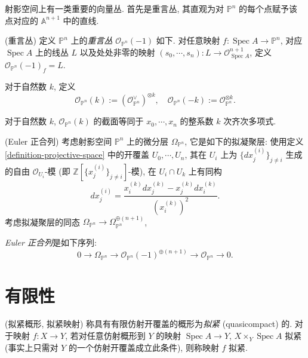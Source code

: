 \documentclass{book}
\begin{document}
	射影空间上有一类重要的向量丛.
	首先是重言丛, 其直观为对 $\mathbb P^n$ 的每个点赋予该点对应的 $\mathbb A^{n+1}$ 中的直线.
	
	\begin{definition}
		{(重言丛)}
		定义 $\mathbb P^n$ 上的\emph{重言丛} $\mathcal O_{\mathbb P^n}(-1)$ 如下.
		对任意映射 $f\colon \operatorname{Spec} A\to \mathbb P^n$, 对应 $\operatorname{Spec} A$ 上的线丛 $L$ 以及处处非零的映射 $(s_0,\cdots,s_n)\colon L\to \mathcal O_{\operatorname{Spec} A}^{n+1}$,
		定义 $\mathcal O_{\mathbb P^n}(-1)_f = L.$
	\end{definition}
	
	\begin{definition}
		{}
		对于自然数 $k$, 定义
		$$
		\mathcal O_{\mathbb P^n}(k):= (\mathcal O_{\mathbb P^n}^\vee)^{\otimes k},\quad
		\mathcal O_{\mathbb P^n}(-k):=\mathcal O_{\mathbb P^n}^{\otimes k}.
		$$
	\end{definition}
	
	\begin{prop}
		{}
		对于自然数 $k$,
		$\mathcal O_{\mathbb P^n}(k)$
		的截面等同于 $x_0,\cdots,x_n$ 的整系数 $k$ 次齐次多项式.
	\end{prop}
	
	\begin{prop}
		{(Euler 正合列)}
		考虑射影空间 $\mathbb P^n$ 上的微分层 $\Omega_{\mathbb P^n}$, 它是如下的拟凝聚层: 使用定义 \ref{definition-projective-space} 中的开覆盖 $U_0,\cdots,U_n$, 其在 $U_i$ 上为 $\{dx_j^{(i)}\}_{j\neq i}$ 生成的自由 $\mathcal O_{U_i}$-模 (即 $\mathbb{Z}[\{x_j^{(i)}\}_{j\neq i}]$-模), 在 $U_i\cap U_k$ 上有同构
		$$
		dx_j^{(i)} = \frac{x_i^{(k)}dx_j^{(k)} - x_j^{(k)}dx_i^{(k)}}{(x_i^{(k)})^2}.
		$$
		考虑拟凝聚层的同态 $\Omega_{\mathbb P^n}\to\Omega_{\mathbb P^n}^{\oplus(n+1)}$,
		
		\emph{Euler 正合列}是如下序列:
		$$
		0 \to \Omega_{\mathbb P^n} \to \mathcal O_{\mathbb P^n}(-1)^{\oplus (n+1)} \to \mathcal O_{\mathbb P^n}\to 0.
		$$
	\end{prop}
	
	\section{有限性}
	
	\begin{definition}
		{(拟紧概形, 拟紧映射)}
		称具有有限仿射开覆盖的概形为\emph{拟紧} (quasicompact) 的.
		对于映射 $f\colon X\to Y$, 若对任意仿射概形到 $Y$ 的映射 $\operatorname{Spec} A\to Y$, $X\times_Y\operatorname{Spec} A$ 拟紧 (事实上只需对 $Y$ 的一个仿射开覆盖成立此条件), 则称映射 $f$ 拟紧.
	\end{definition}
	
\end{document}
